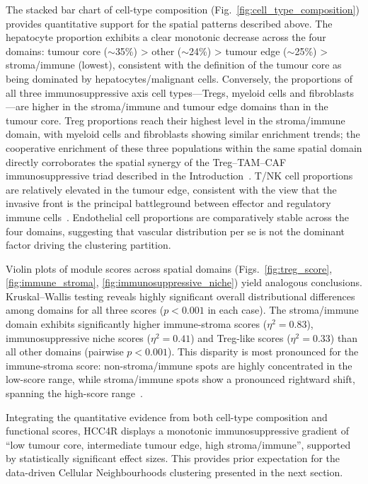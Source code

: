 \documentclass[12pt, a4paper]{article}
\begin{document}
The stacked bar chart of cell-type composition (Fig.~\ref{fig:cell_type_composition}) provides quantitative support for the spatial patterns described above. The hepatocyte proportion exhibits a clear monotonic decrease across the four domains: tumour core ($\sim$35\%) > other ($\sim$24\%) > tumour edge ($\sim$25\%) > stroma/immune (lowest), consistent with the definition of the tumour core as being dominated by hepatocytes/malignant cells. Conversely, the proportions of all three immunosuppressive axis cell types---Tregs, myeloid cells and fibroblasts---are higher in the stroma/immune and tumour edge domains than in the tumour core. Treg proportions reach their highest level in the stroma/immune domain, with myeloid cells and fibroblasts showing similar enrichment trends; the cooperative enrichment of these three populations within the same spatial domain directly corroborates the spatial synergy of the Treg--TAM--CAF immunosuppressive triad described in the Introduction~\citep{sakaguchi2020regulatory,noy2014tumor,kalluri2016biology}. T/NK cell proportions are relatively elevated in the tumour edge, consistent with the view that the invasive front is the principal battleground between effector and regulatory immune cells~\citep{schurch2020coordinated}. Endothelial cell proportions are comparatively stable across the four domains, suggesting that vascular distribution per se is not the dominant factor driving the clustering partition.

Violin plots of module scores across spatial domains (Figs.~\ref{fig:treg_score}, \ref{fig:immune_stroma}, \ref{fig:immunosuppressive_niche}) yield analogous conclusions. Kruskal--Wallis testing reveals highly significant overall distributional differences among domains for all three scores ($p < 0.001$ in each case). The stroma/immune domain exhibits significantly higher immune-stroma scores ($\eta^2 = 0.83$), immunosuppressive niche scores ($\eta^2 = 0.41$) and Treg-like scores ($\eta^2 = 0.33$) than all other domains (pairwise $p < 0.001$). This disparity is most pronounced for the immune-stroma score: non-stroma/immune spots are highly concentrated in the low-score range, while stroma/immune spots show a pronounced rightward shift, spanning the high-score range~\citep{mann1947test}.

Integrating the quantitative evidence from both cell-type composition and functional scores, HCC4R displays a monotonic immunosuppressive gradient of ``low tumour core, intermediate tumour edge, high stroma/immune'', supported by statistically significant effect sizes. This provides prior expectation for the data-driven Cellular Neighbourhoods clustering presented in the next section.
\end{document}
